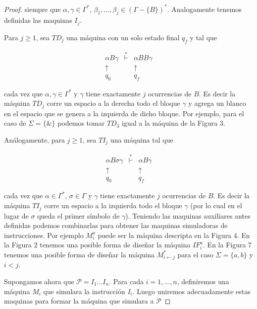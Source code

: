\begin{lemma}
\begin{proof}
		\bigskip

    \noindent siempre que $\alpha ,\gamma \in \Gamma ^{\ast }$, $\beta _{1},...,\beta _{j}\in (\Gamma -\{B\})^{\ast }$.
    Analogamente tenemos definidas las maquinas $I_{j}.$

    Para $j\geq 1$, sea $TD_{j}$ una máquina con un solo estado final $q_{f}$ y tal que

		\[
    \displaystyle \begin{array}{ccc} \alpha B\gamma & \overset{\ast }{\vdash } & \alpha BB\gamma \\
    \uparrow & & \uparrow \ \ \\ q_{0} & & q_{f}\ \ \end{array}
    \]

		\bigskip

    cada vez que $\alpha ,\gamma \in \Gamma ^{\ast }$ y $\gamma $ tiene exactamente $j$ ocurrencias de $B$.
    Es decir la máquina $TD_{j}$ corre un espacio a la derecha todo el bloque $\gamma $ y agrega un blanco en el espacio
    que se genera a la izquierda de dicho bloque. Por ejemplo, para el caso de $\Sigma =\{\& \}$ podemos tomar $TD_{3}$
    igual a la máquina de la Figura 3.

    Análogamente, para $j\geq 1$, sea $TI_{j}$ una máquina tal que

		\[
	  \displaystyle \begin{array}{ccc} \alpha B\sigma \gamma & \overset{\ast }{\vdash } & \alpha B\gamma \\
    \uparrow \ & & \uparrow \\ q_{0}\ \ & & q_{f} \end{array}
	  \]

    cada vez que $\alpha \in \Gamma ^{\ast }$, $\sigma \in \Gamma $ y $\gamma $ tiene exactamente $j$ ocurrencias de
    $B$. Es decir la máquina $TI_{j}$ corre un espacio a la izquierda todo el bloque $\gamma $ (por lo cual en el lugar
    de $\sigma $ queda el primer símbolo de $\gamma $).
    Teniendo las maquinas auxiliares antes definidas podemos combinarlas para obtener las maquinas simuladoras de
    instrucciones. Por ejemplo $M_{i}^{a}$ puede ser la máquina descripta en la Figura 4. En la Figura 2 tenemos una
    posible forma de diseñar la máquina $IF_{i}^{a}$. En la Figura 7 tenemos una posible forma de diseñar la máquina
    $M_{i\leftarrow j}^{\ast }$ para el caso $\Sigma =\{a,b\}$ y $i< j$.

    Supongamos ahora que $\mathcal{P}=I_{1}...I_{n}$. Para cada $i=1,...,n$, definiremos una máquina $M_{i}$ que
    simulara la instrucción $I_{i}$. Luego uniremos adecuadamente estas maquinas para formar la máquina que simulara a
    $ \mathcal{P}$


\end{proof}
\end{lemma}

